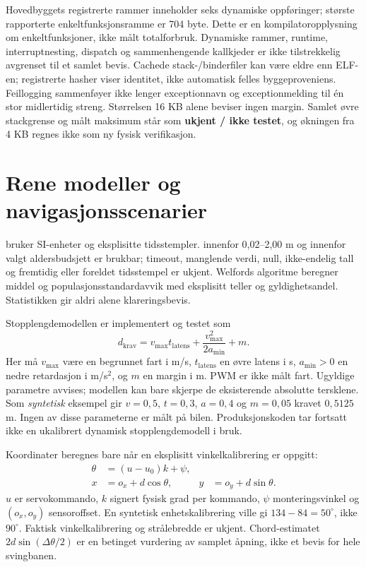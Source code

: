 Hovedbyggets registrerte rammer inneholder seks dynamiske oppføringer;
største rapporterte enkeltfunksjonsramme er 704 byte. Dette er en
kompilatoropplysning om enkeltfunksjoner, ikke målt totalforbruk.
Dynamiske rammer, runtime, interruptnesting, dispatch og sammenhengende
kallkjeder er ikke tilstrekkelig avgrenset til et samlet bevis. Cachede
stack-/binderfiler kan være eldre enn ELF-en; registrerte hasher viser
identitet, ikke automatisk felles byggeproveniens. Feillogging sammenføyer ikke lenger exceptionnavn og exceptionmelding
til én stor midlertidig streng. Størrelsen 16 KB alene
beviser ingen margin. Samlet øvre stackgrense og målt maksimum står som
\textbf{ukjent / ikke testet}, og økningen fra 4 KB regnes ikke som ny
fysisk verifikasjon.

\section{Rene modeller og navigasjonsscenarier}
 bruker SI-enheter og eksplisitte tidsstempler.
 innenfor 0,02--2,00 m og innenfor valgt aldersbudsjett er
brukbar; timeout, manglende verdi, null, ikke-endelig tall og fremtidig
eller foreldet tidsstempel er ukjent. Welfords algoritme beregner middel
og populasjonsstandardavvik med eksplisitt teller og gyldighetsandel.
Statistikken gir aldri alene klareringsbevis.

Stopplengdemodellen er implementert og testet som
\begin{equation}
 d_{\mathrm{krav}} = v_{\max} t_{\mathrm{latens}} +
 \frac{v_{\max}^2}{2a_{\min}} + m .
\end{equation}
Her må $v_{\max}$ være en begrunnet fart i m/s, $t_{\mathrm{latens}}$ en
øvre latens i s, $a_{\min}>0$ en nedre retardasjon i m/s$^2$, og $m$
en margin i m. PWM er ikke målt fart. Ugyldige parametre avvises;
modellen kan bare skjerpe de eksisterende absolutte tersklene.
Som \emph{syntetisk} eksempel gir $v=0{,}5$, $t=0{,}3$, $a=0{,}4$
og $m=0{,}05$ kravet $0{,}5125$ m. Ingen av disse parameterne er
målt på bilen. Produksjonskoden tar fortsatt ikke en ukalibrert dynamisk
stopplengdemodell i bruk.

Koordinater beregnes bare når en eksplisitt vinkelkalibrering er oppgitt:
\begin{align}
 \theta &= (u-u_0)k+\psi,\\
 x &= o_x+d\cos\theta, & y &= o_y+d\sin\theta.
\end{align}
$u$ er servokommando, $k$ signert fysisk grad per kommando, $\psi$
monteringsvinkel og $(o_x,o_y)$ sensoroffset. En syntetisk enhetskalibrering
ville gi $134-84=50^\circ$, ikke $90^\circ$. Faktisk vinkelkalibrering og
strålebredde er ukjent. Chord-estimatet $2d\sin(\Delta\theta/2)$ er en
betinget vurdering av samplet åpning, ikke et bevis for hele svingbanen.

